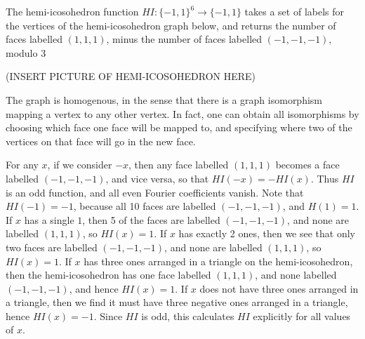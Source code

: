 \begin{example}
    The hemi-icosohedron function $HI: \{ -1, 1 \}^6 \to \{ -1, 1 \}$ takes a set of labels for the vertices of the hemi-icosohedron graph below, and returns the number of faces labelled $(1,1,1)$, minus the number of faces labelled $(-1,-1,-1)$, modulo 3
    \begin{center}
    (INSERT PICTURE OF HEMI-ICOSOHEDRON HERE)
    \end{center}
    The graph is homogenous, in the sense that there is a graph isomorphism mapping a vertex to any other vertex. In fact, one can obtain all isomorphisms by choosing which face one face will be mapped to, and specifying where two of the vertices on that face will go in the new face.

    For any $x$, if we consider $-x$, then any face labelled $(1,1,1)$ becomes a face labelled $(-1,-1,-1)$, and vice versa, so that $HI(-x) = - HI(x)$. Thus $HI$ is an odd function, and all even Fourier coefficients vanish. Note that $HI(-1) = -1$, because all 10 faces are labelled $(-1,-1,-1)$, and $H(1) = 1$. If $x$ has a single $1$, then 5 of the faces are labelled $(-1,-1,-1)$, and none are labelled $(1,1,1)$, so $HI(x) = 1$. If $x$ has exactly 2 ones, then we see that only two faces are labelled $(-1,-1,-1)$, and none are labelled $(1,1,1)$, so $HI(x) = 1$. If $x$ has three ones arranged in a triangle on the hemi-icosohedron, then the hemi-icosohedron has one face labelled $(1,1,1)$, and none labelled $(-1,-1,-1)$, and hence $HI(x) = 1$. If $x$ does not have three ones arranged in a triangle, then we find it must have three negative ones arranged in a triangle, hence $HI(x) = -1$. Since $HI$ is odd, this calculates $HI$ explicitly for all values of $x$.


\end{example}
